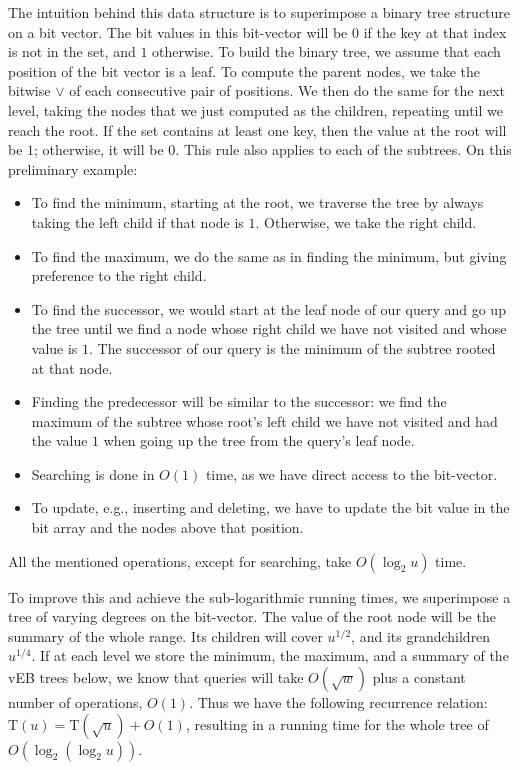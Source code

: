 The intuition behind this data structure is to superimpose a binary tree structure on a bit vector.
The bit values in this bit-vector will be $0$ if the key at that index is not in the set, and $1$ otherwise.
To build the binary tree, we assume that each position of the bit vector is a leaf.
To compute the parent nodes, we take the bitwise $\vee$ of each consecutive pair of positions.
We then do the same for the next level, taking the nodes that we just computed as the children, repeating until we reach the root.
If the set contains at least one key, then the value at the root will be $1$; otherwise, it will be $0$.
This rule also applies to each of the subtrees.
On this preliminary example:
\begin{itemize}
    \item
    To find the minimum, starting at the root, we traverse the tree by always taking the left child if that node is $1$. Otherwise, we take the right child.
    
    \item
    To find the maximum, we do the same as in finding the minimum, but giving preference to the right child.
    
    \item
    To find the successor, we would start at the leaf node of our query and go up the tree until we find a node whose right child we have not visited and whose value is $1$. The successor of our query is the minimum of the subtree rooted at that node.
    
    \item
    Finding the predecessor will be similar to the successor: we find the maximum of the subtree whose root's left child we have not visited and had the value $1$ when going up the tree from the query's leaf node.
    
    \item
    Searching is done in $O(1)$ time, as we have direct access to the bit-vector.
    
    \item
    To update, e.g., inserting and deleting, we have to update the bit value in the bit array and the nodes above that position.
\end{itemize}

All the mentioned operations, except for searching, take $O(\log_2 u)$ time. 

To improve this and achieve the sub-logarithmic running times, we superimpose a tree of varying degrees on the bit-vector. The value of the root node will be the summary of the whole range. Its children will cover $u^{1/2}$, and its grandchildren $u^{1/4}$. If at each level we store the minimum, the maximum, and a summary of the vEB trees below, we know that queries will take $O(\sqrt{w})$ plus a constant number of operations, $O(1)$. Thus we have the following recurrence relation: $\text{T}(u) = \text{T}(\sqrt{u}) + O(1)$, resulting in a running time for the whole tree of $O(\log_2(\log_2 u))$.

